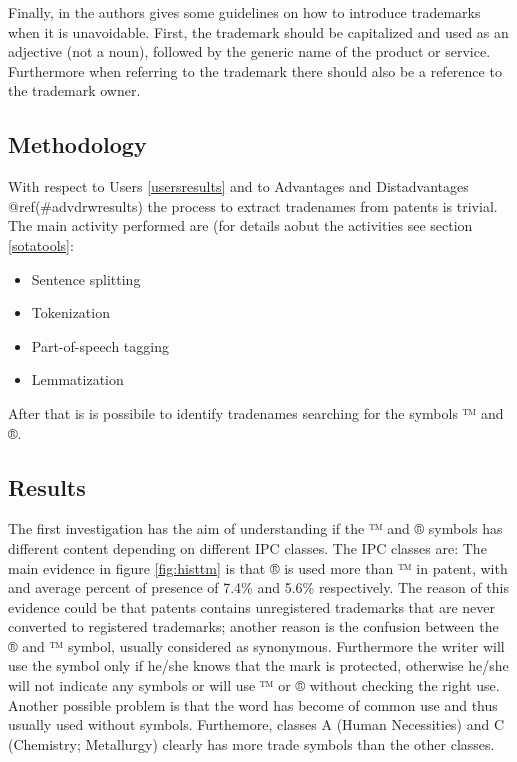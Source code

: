 \documentclass[]{book}
\providecommand{\tightlist}{%
  \setlength{\itemsep}{0pt}\setlength{\parskip}{0pt}}
\begin{document}
Finally, in \citep{pressman2018nolo} the authors gives some guidelines
on how to introduce trademarks when it is unavoidable. First, the
trademark should be capitalized and used as an adjective (not a noun),
followed by the generic name of the product or service. Furthermore when
referring to the trademark there should also be a reference to the
trademark owner.

\subsection{Methodology}\label{methodology-1}

With respect to Users \ref{usersresults} and to Advantages and
Distadvantages @ref(\#advdrwresults) the process to extract tradenames
from patents is trivial. The main activity performed are (for details
aobut the activities see section \ref{sotatools}:

\begin{itemize}
\tightlist
\item
  Sentence splitting
\item
  Tokenization
\item
  Part-of-speech tagging
\item
  Lemmatization
\end{itemize}

After that is is possibile to identify tradenames searching for the
symbols ™ and ®.

\subsection{Results}\label{results-2}

The first investigation has the aim of understanding if the ™ and ®
symbols has different content depending on different IPC \citep{wipo1}
classes. The IPC classes are: The main evidence in figure
\ref{fig:histtm} is that ® is used more than ™ in patent, with and
average percent of presence of 7.4\% and 5.6\% respectively. The reason
of this evidence could be that patents contains unregistered trademarks
that are never converted to registered trademarks; another reason is the
confusion between the ® and ™ symbol, usually considered as synonymous.
Furthermore the writer will use the symbol only if he/she knows that the
mark is protected, otherwise he/she will not indicate any symbols or
will use ™ or ® without checking the right use. Another possible problem
is that the word has become of common use and thus usually used without
symbols. Furthemore, classes A (Human Necessities) and C (Chemistry;
Metallurgy) clearly has more trade symbols than the other classes.
\end{document}
